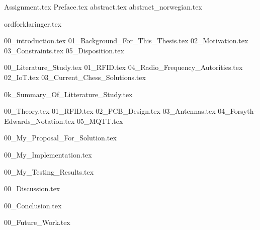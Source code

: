 \documentclass[pdftex,10pt,b5paper,twoside, oldfontcommands]{memoir}
\begin{document}
\setlength{\parindent}{0em}
\listoftodos
\vfill
\newpage
\cleardoublepage


\setcounter{page}{1}
{Assignment.tex}
{Preface.tex}
{abstract.tex}
{abstract_norwegian.tex}

\tableofcontents
\cleardoublepage
\listoffigures
\cleardoublepage
\listoftables
{ordforklaringer.tex}
\newpage
{}%

{00_introduction.tex}
{01_Background_For_This_Thesis.tex}
{02_Motivation.tex}
{03_Constraints.tex}
{05_Disposition.tex}

{00_Literature_Study.tex}
{01_RFID.tex}
{04_Radio_Frequency_Autorities.tex}
{02_IoT.tex}
{03_Current_Chess_Solutions.tex}

{0k_Summary_Of_Litterature_Study.tex}

{00_Theory.tex}
{01_RFID.tex}
{02_PCB_Design.tex}
{03_Antennas.tex}
{04_Forsyth-Edwards_Notation.tex}
{05_MQTT.tex}

{00_My_Proposal_For_Solution.tex}

{00_My_Implementation.tex}

{00_My_Testing_Results.tex}

{00_Discussion.tex}

{00_Conclusion.tex}

{00_Future_Work.tex}

\newpage %

\end{document}
